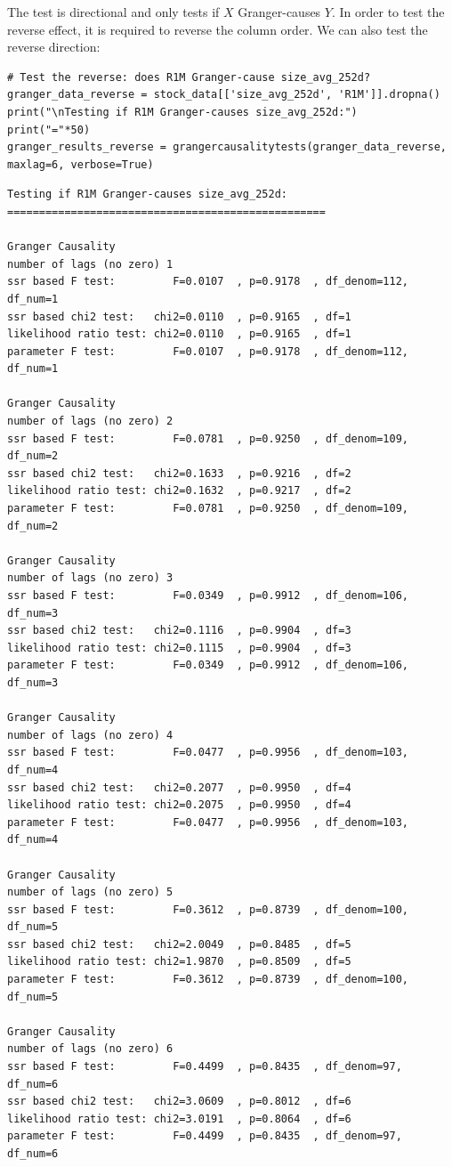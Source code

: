 The test is directional and only tests if $X$ Granger-causes $Y$. In order to test the reverse effect, it is required to reverse the column order. We can also test the reverse direction:

\begin{verbatim}
# Test the reverse: does R1M Granger-cause size_avg_252d?
granger_data_reverse = stock_data[['size_avg_252d', 'R1M']].dropna()
print("\nTesting if R1M Granger-causes size_avg_252d:")
print("="*50)
granger_results_reverse = grangercausalitytests(granger_data_reverse, maxlag=6, verbose=True)
\end{verbatim}

\begin{verbatim}
Testing if R1M Granger-causes size_avg_252d:
==================================================

Granger Causality
number of lags (no zero) 1
ssr based F test:         F=0.0107  , p=0.9178  , df_denom=112, df_num=1
ssr based chi2 test:   chi2=0.0110  , p=0.9165  , df=1
likelihood ratio test: chi2=0.0110  , p=0.9165  , df=1
parameter F test:         F=0.0107  , p=0.9178  , df_denom=112, df_num=1

Granger Causality
number of lags (no zero) 2
ssr based F test:         F=0.0781  , p=0.9250  , df_denom=109, df_num=2
ssr based chi2 test:   chi2=0.1633  , p=0.9216  , df=2
likelihood ratio test: chi2=0.1632  , p=0.9217  , df=2
parameter F test:         F=0.0781  , p=0.9250  , df_denom=109, df_num=2

Granger Causality
number of lags (no zero) 3
ssr based F test:         F=0.0349  , p=0.9912  , df_denom=106, df_num=3
ssr based chi2 test:   chi2=0.1116  , p=0.9904  , df=3
likelihood ratio test: chi2=0.1115  , p=0.9904  , df=3
parameter F test:         F=0.0349  , p=0.9912  , df_denom=106, df_num=3

Granger Causality
number of lags (no zero) 4
ssr based F test:         F=0.0477  , p=0.9956  , df_denom=103, df_num=4
ssr based chi2 test:   chi2=0.2077  , p=0.9950  , df=4
likelihood ratio test: chi2=0.2075  , p=0.9950  , df=4
parameter F test:         F=0.0477  , p=0.9956  , df_denom=103, df_num=4

Granger Causality
number of lags (no zero) 5
ssr based F test:         F=0.3612  , p=0.8739  , df_denom=100, df_num=5
ssr based chi2 test:   chi2=2.0049  , p=0.8485  , df=5
likelihood ratio test: chi2=1.9870  , p=0.8509  , df=5
parameter F test:         F=0.3612  , p=0.8739  , df_denom=100, df_num=5

Granger Causality
number of lags (no zero) 6
ssr based F test:         F=0.4499  , p=0.8435  , df_denom=97, df_num=6
ssr based chi2 test:   chi2=3.0609  , p=0.8012  , df=6
likelihood ratio test: chi2=3.0191  , p=0.8064  , df=6
parameter F test:         F=0.4499  , p=0.8435  , df_denom=97, df_num=6
\end{verbatim}


